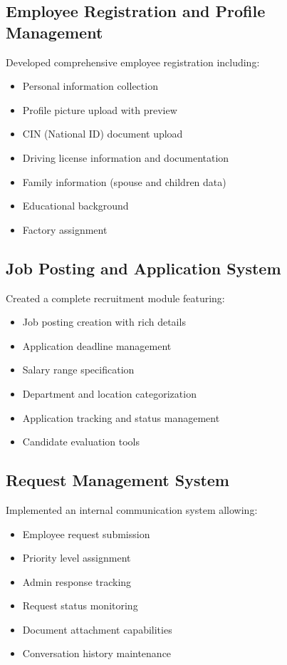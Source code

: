 \subsection{Employee Registration and Profile Management}
Developed comprehensive employee registration including:
\begin{itemize}
    \item Personal information collection
    \item Profile picture upload with preview
    \item CIN (National ID) document upload
    \item Driving license information and documentation
    \item Family information (spouse and children data)
    \item Educational background
    \item Factory assignment
\end{itemize}

\subsection{Job Posting and Application System}
Created a complete recruitment module featuring:
\begin{itemize}
    \item Job posting creation with rich details
    \item Application deadline management
    \item Salary range specification
    \item Department and location categorization
    \item Application tracking and status management
    \item Candidate evaluation tools
\end{itemize}

\subsection{Request Management System}
Implemented an internal communication system allowing:
\begin{itemize}
    \item Employee request submission
    \item Priority level assignment
    \item Admin response tracking
    \item Request status monitoring
    \item Document attachment capabilities
    \item Conversation history maintenance
\end{itemize}

